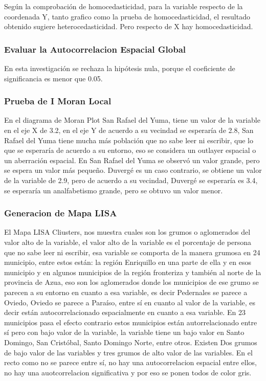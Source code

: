 \documentclass[11pt,]{article}
\begin{document}
Según la comprobación de homocedasticidad, para la variable respecto de
la coordenada Y, tanto grafico como la prueba de homocedasticidad, el
resultado obtenido sugiere heterocedasticidad. Pero respecto de X hay
homocedasticidad.

\subsubsection{Evaluar la Autocorrelacion Espacial
Global}\label{evaluar-la-autocorrelacion-espacial-global}

En esta investigación se rechaza la hipótesis nula, porque el
coeficiente de significancia es menor que 0.05.

\subsubsection{Prueba de I Moran Local}\label{prueba-de-i-moran-local}

En el diagrama de Moran Plot San Rafael del Yuma, tiene un valor de la
variable en el eje X de 3.2, en el eje Y de acuerdo a su vecindad se
esperaría de 2.8, San Rafael del Yuma tiene mucha más población que no
sabe leer ni escribir, que lo que se esperaría de acuerdo a su entorno,
eso se considera un outlayer espacial o un aberración espacial. En San
Rafael del Yuma se observó un valor grande, pero se espera un valor más
pequeño. Duvergé es un caso contrario, se obtiene un valor de la
variable de 2.9, pero de acuerdo a su vecindad, Duvergé se esperaría es
3.4, se esperaría un analfabetismo grande, pero se obtuvo un valor
menor.

\subsubsection{Generacion de Mapa LISA}\label{generacion-de-mapa-lisa}

El Mapa LISA Cliusters, nos muestra cuales son los grumos o aglomerados
del valor alto de la variable, el valor alto de la variable es el
porcentaje de persona que no sabe leer ni escribir, esa variable se
comporta de la manera grumosa en 24 municipio, entre estos están: la
región Enriquillo en una parte de ella y en esos municipio y en algunos
municipios de la región fronteriza y también al norte de la provincia de
Azua, eso son los aglomerados donde los municipios de ese grumo se
parecen a su entorno en cuanto a esa variable, es decir Pedernales se
parece a Oviedo, Oviedo se parece a Paraíso, entre sí en cuanto al valor
de la variable, es decir están autocorrelacionado espacialmente en
cuanto a esa variable. En 23 municipios pasa el efecto contrario estos
municipios están autorrelacionado entre sí pero con bajo valor de la
variable, la variable tiene un bajo valor en Santo Domingo, San
Cristóbal, Santo Domingo Norte, entre otros. Existen Dos grumos de bajo
valor de las variables y tres grumos de alto valor de las variables. En
el recto como no se parece entre sí, no hay una autocorrelacion espacial
entre ellos, no hay una auotcorrelacion significativa y por eso se ponen
todos de color gris.
\end{document}
